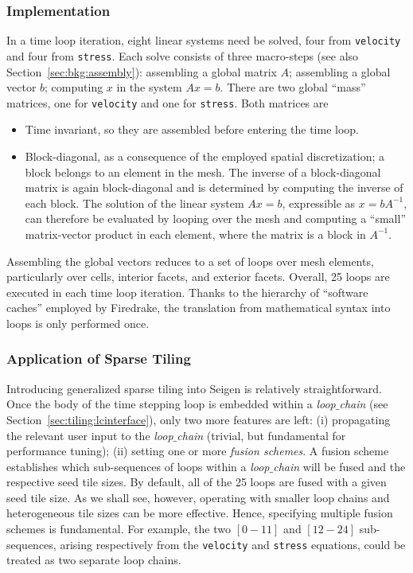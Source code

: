 \subsubsection{Implementation}
In a time loop iteration, eight linear systems need be solved, four from {\tt velocity} and four from {\tt stress}. Each solve consists of three macro-steps (see also Section~\ref{sec:bkg:assembly}): assembling a global matrix $A$; assembling a global vector $b$; computing $x$ in the system $Ax = b$. There are two global ``mass'' matrices, one for {\tt velocity} and one for {\tt stress}. Both matrices are
\begin{itemize}
\item Time invariant, so they are assembled before entering the time loop.
\item Block-diagonal, as a consequence of the employed spatial discretization; a block belongs to an element in the mesh. The inverse of a block-diagonal matrix is again block-diagonal and is determined by computing the inverse of each block. The solution of the linear system $Ax = b$, expressible as $x = b A^{-1}$, can therefore be evaluated by looping over the mesh and computing a ``small'' matrix-vector product in each element, where the matrix is a block in $A^{-1}$.
\end{itemize}
Assembling the global vectors reduces to a set of loops over mesh elements, particularly over cells, interior facets, and exterior facets. Overall, 25 loops are executed in each time loop iteration. Thanks to the hierarchy of ``software caches'' employed by Firedrake, the translation from mathematical syntax into loops is only performed once. 


\subsubsection{Application of Sparse Tiling}
Introducing generalized sparse tiling into Seigen is relatively straightforward. Once the body of the time stepping loop is embedded within a {\em loop$\_$chain} (see Section~\ref{sec:tiling:lcinterface}), only two more features are left: (i) propagating the relevant user input to the {\em loop$\_$chain} (trivial, but fundamental for performance tuning); (ii) setting one or more {\em fusion schemes}. A fusion scheme establishes which sub-sequences of loops within a {\em loop$\_$chain} will be fused and the respective seed tile sizes. By default, all of the 25 loops are fused with a given seed tile size. As we shall see, however, operating with smaller loop chains and heterogeneous tile sizes can be more effective. Hence, specifying multiple fusion schemes is fundamental. For example, the two $[0-11]$ and $[12-24]$ sub-sequences, arising respectively from the {\tt velocity} and {\tt stress} equations, could be treated as two separate loop chains. 

